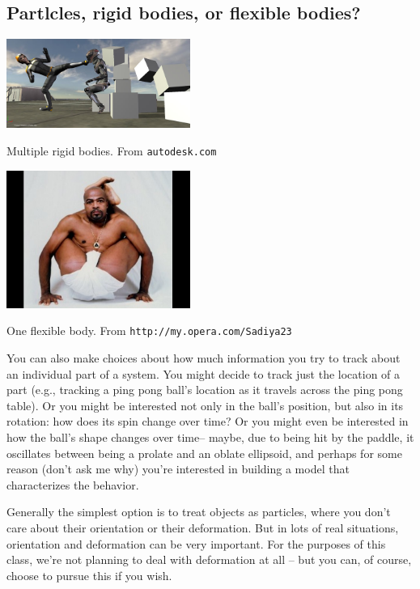 \documentclass{tufte-handout}
\begin{document}
\subsection{Partlcles, rigid bodies, or flexible bodies?}

\begin{marginfigure}
\includegraphics[width=6cm]{figs/rigidbodies}
\caption{Multiple rigid bodies.  From {\tt autodesk.com}
 }
\end{marginfigure}

\begin{marginfigure}
\includegraphics[width=6cm]{figs/flexiblebody}
\caption{One flexible body.  From {\tt http://my.opera.com/Sadiya23}
 }
\end{marginfigure}
You can also make choices about how much information you try to track about an individual part of a system.  You might decide to track just the location of a part (e.g., tracking a ping pong ball's location as it travels across the ping pong table).  Or you might be interested not only in the ball's position, but also in its rotation:  how does its spin change over time?  Or you might even be interested in how the ball's shape changes over time-- maybe, due to being hit by the paddle, it oscillates between being a prolate and an oblate ellipsoid, and perhaps for some reason (don't ask me why) you're interested in building a model that characterizes the behavior.

Generally the simplest option is to treat objects as particles, where you don't care about their orientation or their deformation.  But in lots of real situations, orientation and deformation can be very important.  For the purposes of this class, we're not planning to deal with deformation at all -- but you can, of course, choose to pursue this if you wish.
\end{document}
